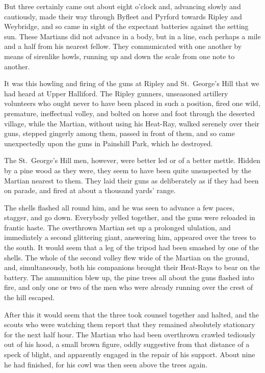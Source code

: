 But three certainly came out about eight o'clock and, advancing
slowly and cautiously, made their way through Byfleet and Pyrford
towards Ripley and Weybridge, and so came in sight of the expectant
batteries against the setting sun. These Martians did not advance
in a body, but in a line, each perhaps a mile and a half from his
nearest fellow. They communicated with one another by means of
sirenlike howls, running up and down the scale from one note to
another.

It was this howling and firing of the guns at Ripley and St.\ George's
Hill that we had heard at Upper Halliford. The Ripley
gunners, unseasoned artillery volunteers who ought never to have
been placed in such a position, fired one wild, premature,
ineffectual volley, and bolted on horse and foot through the
deserted village, while the Martian, without using his Heat-Ray,
walked serenely over their guns, stepped gingerly among them,
passed in front of them, and so came unexpectedly upon the guns in
Painshill Park, which he destroyed.

The St.\ George's Hill men, however, were better led or of a better
mettle. Hidden by a pine wood as they were, they seem to have been
quite unsuspected by the Martian nearest to them. They laid their
guns as deliberately as if they had been on parade, and fired at
about a thousand yards' range.

The shells flashed all round him, and he was seen to advance a few
paces, stagger, and go down. Everybody yelled together, and the
guns were reloaded in frantic haste. The overthrown Martian set up
a prolonged ululation, and immediately a second glittering giant,
answering him, appeared over the trees to the south. It would seem
that a leg of the tripod had been smashed by one of the shells. The
whole of the second volley flew wide of the Martian on the ground,
and, simultaneously, both his companions brought their Heat-Rays to
bear on the battery. The ammunition blew up, the pine trees all
about the guns flashed into fire, and only one or two of the men
who were already running over the crest of the hill escaped.

After this it would seem that the three took counsel together and
halted, and the scouts who were watching them report that they
remained absolutely stationary for the next half hour. The Martian
who had been overthrown crawled tediously out of his hood, a small
brown figure, oddly suggestive from that distance of a speck of
blight, and apparently engaged in the repair of his support. About
nine he had finished, for his cowl was then seen above the trees
again.

